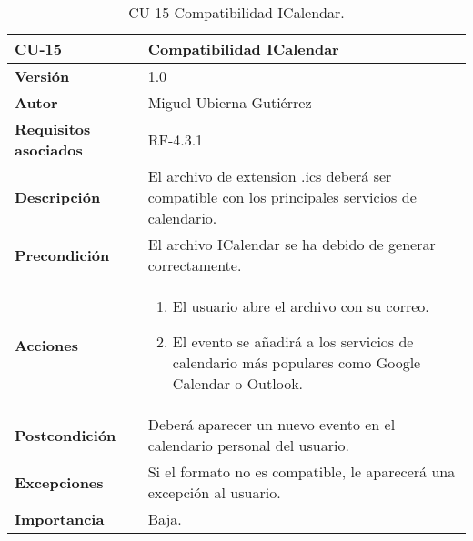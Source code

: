 \begin{table}[p]
	\centering
	\begin{tabularx}{\linewidth}{ p{} p{} }
		\toprule
		\textbf{CU-15}    & \textbf{Compatibilidad ICalendar}\\
		\toprule
		\textbf{Versión}              & 1.0    \\
		\textbf{Autor}                & Miguel Ubierna Gutiérrez \\
		\textbf{Requisitos asociados} & RF-4.3.1  \\
		\textbf{Descripción}          & El archivo de extension .ics deberá ser compatible con los principales servicios de calendario.\\
		\textbf{Precondición}         & El archivo ICalendar se ha debido de generar correctamente.\\
		\textbf{Acciones}             &
		\begin{enumerate}
			\def\labelenumi{\arabic{enumi}.}
			\tightlist
                \item El usuario abre el archivo con su correo.
                \item El evento se añadirá a los servicios de calendario más populares como Google Calendar o Outlook.
		\end{enumerate}\\
		\textbf{Postcondición}        & Deberá aparecer un nuevo evento en el calendario personal del usuario. \\
		\textbf{Excepciones}          & Si el formato no es compatible, le aparecerá una excepción al usuario. \\
		\textbf{Importancia}          & Baja.  \\
		\bottomrule
	\end{tabularx}
	\caption{CU-15 Compatibilidad ICalendar.}
\end{table}


